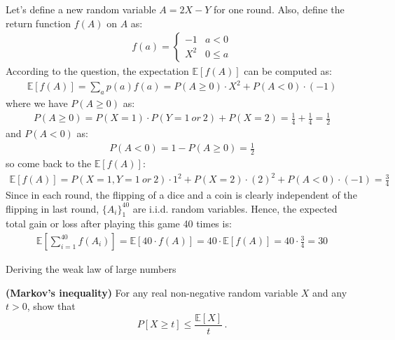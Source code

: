 \documentclass[a4paper,10pt]{article}
\begin{document}
\begin{solution}
Let's define a new random variable $A = 2X - Y$ for one round. Also, define the return function $f(A)$ on $A$ as:
\begin{align}
    f(a) =  \begin{cases} 
                -1 & a < 0 \\
                X^2 & 0 \leq a 
            \end{cases}
\end{align}
According to the question, the expectation $\mathbb{E}[f(A)]$ can be computed as:
    \begin{align}
        \mathbb{E}[f(A)] = \sum_a p(a) f(a) = P(A \ge 0) \cdot X^{2} + P(A < 0)\cdot(-1)
    \end{align}
where we have $P(A \ge 0)$ as:
    \begin{align}
        P(A \ge 0) = P(X=1)\cdot P(Y=1\ or\ 2 ) + P(X=2) = \frac{1}{4} + \frac{1}{4} = \frac{1}{2}
    \end{align}
and $P(A < 0)$ as:
    \begin{align}
        P(A < 0) = 1 - P(A \ge 0) = \frac{1}{2}
    \end{align}
so come back to the $\mathbb{E}[f(A)]$:
    \begin{align}
        \mathbb{E}[f(A)] = P(X=1,Y=1\ or\ 2) \cdot 1^{2} + P(X=2) \cdot (2)^{2}+P(A<0) \cdot (-1) = \frac{3}{4}
    \end{align}
Since in each round, the flipping of a dice and a coin is clearly independent of the flipping in last round, $\{A_i\}_{1}^{40}$ are i.i.d. random variables. Hence, the expected total gain or loss after playing this game 40 times is:
    \begin{align}
        \mathbb{E}[\sum_{i=1}^{40} f(A_i)]=\mathbb{E}[40 \cdot f(A)]= 40 \cdot \mathbb{E}[f(A)]=40\cdot\frac{3}{4}=30
    \end{align}
\end{solution}












\begin{nproblem}{9}{Deriving the weak law of large numbers}
\end{nproblem}
	\begin{subproblem}{2} \textbf{(Markov's inequality)} For any real non-negative random variable $X$ and any $t > 0$, show that
	\[
	P[X \geq t] \leq \frac{\mathbb{E}[X]}{t}\, .
	\]
\end{subproblem}
\end{document}
